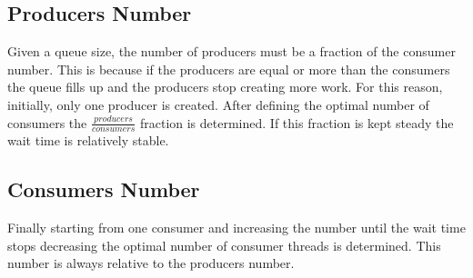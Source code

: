 \documentclass[a4paper, 12pt]{report}
\begin{document}
 
    \begin{figure}[H]\centering
    \end{figure}

    \subsection*{Producers Number}
    
    Given a queue size, the number of producers must be a fraction of the consumer number. This is because if the 
    producers are equal or more than the consumers the queue fills up and the producers stop creating more work.
    For this reason, initially, only one producer is created. After defining the optimal number of consumers the 
    $ \frac{producers}{consumers}$ fraction is determined. If this fraction is kept steady the wait time is 
    relatively stable.

    \subsection*{Consumers Number}

    Finally starting from one consumer and increasing the number until the wait time stops decreasing the optimal 
    number of consumer threads is determined. This number is always relative to the producers number.
    \\
 
\end{document}
